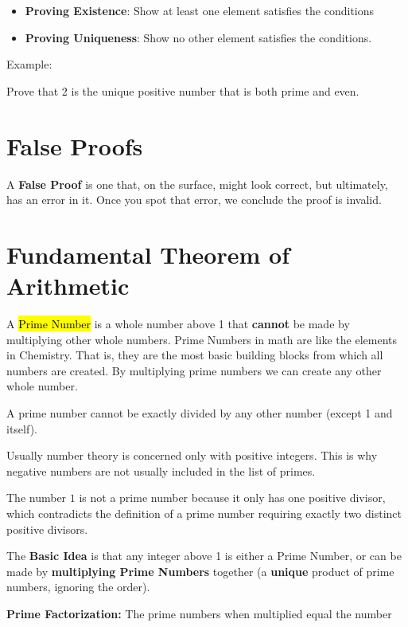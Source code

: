 \begin{itemize}
  \item \textbf{Proving Existence}: Show at least one element satisfies the conditions
  \item \textbf{Proving Uniqueness}: Show no other element satisfies the conditions.
\end{itemize}

Example:

Prove that 2 is the unique positive number that is both prime and even.

\section{False Proofs}

A \textbf{False Proof} is one that, on the surface, might look correct, but ultimately, has an error in it. Once you spot that error, we conclude the proof is invalid.

\section{Fundamental Theorem of Arithmetic}

A \hl{Prime Number} is a whole number above 1 that \textbf{cannot} be made by multiplying other whole numbers. Prime Numbers in math are like the elements in Chemistry. That is, they are the most basic building blocks from which all numbers are created. By multiplying prime numbers we can create any other whole number.

A prime number cannot be exactly divided by any other number (except 1 and itself).

Usually number theory is concerned only with positive integers. This is why negative numbers are not usually included in the list of primes.

The number \(\text{1}\) is not a prime number because it only has one positive divisor, which contradicts the definition of a prime number requiring exactly two distinct positive divisors. 

\vspace{5 mm}

The \textbf{Basic Idea} is that any integer above 1 is either a Prime Number, or can be made by \textbf{multiplying Prime Numbers} together (a \textbf{unique} product of prime numbers, ignoring the order).

\textbf{Prime Factorization:} The prime numbers when multiplied equal the number

